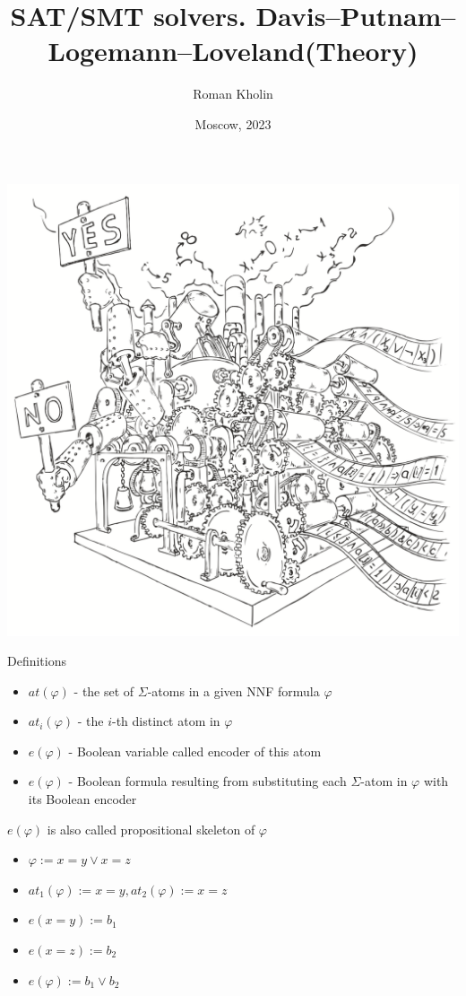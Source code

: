 \documentclass{beamer}
\begin{document}
\title{SAT/SMT solvers. Davis–Putnam–Logemann–Loveland(Theory)}
\author{Roman Kholin}
\date{Moscow, 2023}

\begin{frame}
\includegraphics[scale=0.5]{../decision-procedure.png}
\end{frame}

\frame{\titlepage}

\begin{frame}{Definitions}
\begin{block}{}
\begin{itemize}
\item $at(\varphi)$ - the set of $\Sigma$-atoms in a given NNF formula $\varphi$
\item $at_i(\varphi)$ - the $i$-th distinct atom in $\varphi$
\item $e(\varphi)$ - Boolean variable called encoder of this atom
\item $e(\varphi)$ - Boolean formula resulting from substituting each $\Sigma$-atom in $\varphi$ with its Boolean encoder
\end{itemize}
$e(\varphi)$ is also called propositional skeleton of $\varphi$
\end{block}
\begin{itemize}
\item $\varphi := x = y \vee x = z$
\item $at_1(\varphi) := x = y, at_2(\varphi) := x = z$
\item $e(x = y) := b_1$
\item $e(x = z) := b_2$
\item $e(\varphi) := b_1 \vee b_2$
\end{itemize}
\end{frame}
\end{document}
